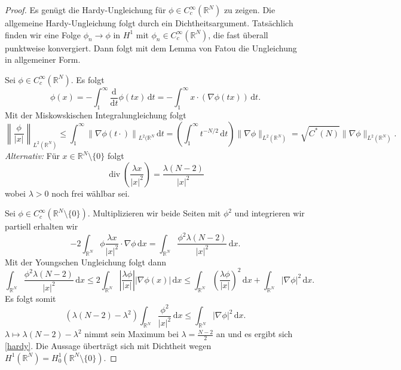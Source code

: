 \documentclass[11pt]{article}
\theoremstyle{break}
\begin{document}
\begin{proof}
Es genügt die Hardy-Ungleichung für $\phi\in C_c^\infty(\mathbb R^N)$ zu zeigen. Die allgemeine Hardy-Ungleichung folgt durch ein Dichtheitsargument.
Tatsächlich finden wir eine Folge $\phi_n\to \phi$ in $H^1$ mit $\phi_n \in C_c^\infty(\mathbb R^N)$, die fast überall punktweise konvergiert. Dann folgt mit dem Lemma von Fatou die Ungleichung in allgemeiner Form.

Sei $\phi \in C_c^\infty(\mathbb R^N)$. Es folgt
\begin{equation}
\phi(x)=-\int_1^\infty \frac{\mathrm d}{\mathrm dt} \phi(tx) \, \mathrm dt= - \int_1^\infty x \cdot (\nabla \phi(tx))\, \mathrm dt.
\end{equation}
Mit der Miskowskischen Integralungleichung folgt
\begin{equation}
\left \| \frac{\phi}{|x|} \right \|_{L^2(\mathbb R^N)} \le \int_1^\infty \left \| \nabla \phi(t\cdot) \right \|_{L^2(\mathbb R^N} \, \mathrm dt = \left ( \int_1^\infty t^{-N/2} \, \mathrm dt \right ) \|\nabla \phi\|_{L^2(\mathbb R^N)}=\sqrt{C^*(N)} \|\nabla\phi\|_{L^2(\mathbb R^N)}.
\end{equation}
{\it Alternativ:} Für $x\in \mathbb R^N\setminus\{0\}$ folgt
\begin{equation}
\operatorname{div} \left ( \frac{\lambda x}{|x|^2} \right ) = \frac{\lambda (N-2)}{|x|^2}
\end{equation}
wobei $\lambda>0$ noch frei wählbar sei. 

Sei $\phi \in C_c^\infty(\mathbb R^N\setminus \{0\})$. Multiplizieren wir beide Seiten mit $\phi^2$ und integrieren wir partiell erhalten wir 
\begin{equation}
-2\int_{\mathbb R^N} \phi \frac{\lambda x}{|x|^2} \cdot \nabla \phi \, \mathrm dx = \int_{\mathbb R^N} \frac{\phi^2\lambda (N-2)}{|x|^2}\, \mathrm dx.
\end{equation}
Mit der Youngschen Ungleichung folgt dann
\begin{equation}
\int_{\mathbb R^N} \frac{\phi^2\lambda (N-2)}{|x|^2} \, \mathrm dx \le 2 \int_{\mathbb R^N} \left | \frac{\lambda \phi}{|x|} \right | |\nabla \phi(x)|\, \mathrm dx \le \int_{\mathbb R^N} \left ( \frac{\lambda \phi}{|x|} \right )^2\, \mathrm dx + \int_{\mathbb R^N} |\nabla \phi|^2\, \mathrm dx.
\end{equation}
Es folgt somit
\begin{equation}
(\lambda(N-2) -\lambda^2)\int_{\mathbb R^N} \frac{\phi^2}{|x|^2}\, \mathrm dx \le \int_{\mathbb R^N} |\nabla \phi|^2\, \mathrm dx.
\end{equation}
$\lambda\mapsto \lambda(N-2)-\lambda^2$ nimmt sein Maximum bei $\lambda= \frac{N-2}{2}$ an und es ergibt sich \eqref{hardy}. Die Aussage überträgt sich mit Dichtheit wegen $H^1(\mathbb R^N) = H_0^1(\mathbb R^N\setminus\{0\})$.
\end{proof}
\end{document}
